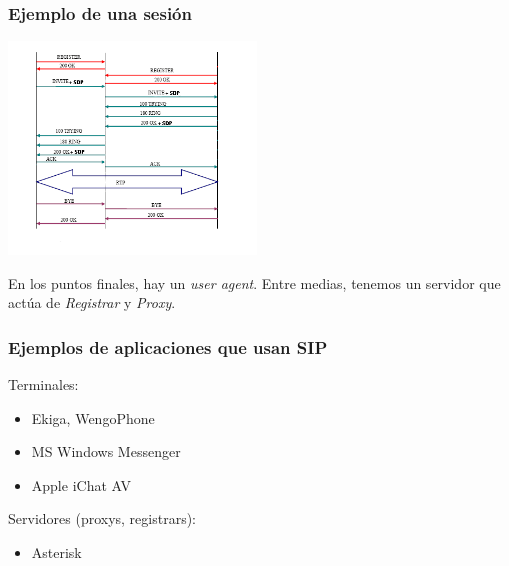 \documentclass{beamer}
\begin{document}

\begin{frame}
\frametitle{Ejemplo de una sesión}

\begin{center}
  \includegraphics[width=6.6cm]{figs/complete-sip-session.png}
\end{center}

En los puntos finales, hay un \emph{user agent}. Entre medias, tenemos un servidor que actúa de \emph{Registrar} y \emph{Proxy}.

\end{frame}




\begin{frame}
\frametitle{Ejemplos de aplicaciones que usan SIP}

Terminales:
\begin{itemize}
\item Ekiga, WengoPhone
\item MS Windows Messenger
\item Apple iChat AV
\end{itemize}

Servidores (proxys, registrars):
\begin{itemize}
\item Asterisk
\end{itemize}

\end{frame}


\end{document}
